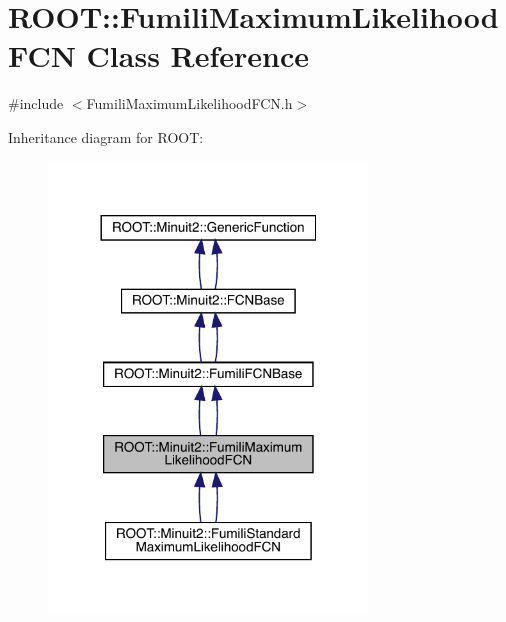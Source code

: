 \hypertarget{classROOT_1_1Minuit2_1_1FumiliMaximumLikelihoodFCN}{}\section{R\+O\+OT\+:\+:Fumili\+Maximum\+Likelihood\+F\+CN Class Reference}
\label{classROOT_1_1Minuit2_1_1FumiliMaximumLikelihoodFCN}


{\ttfamily \#include $<$Fumili\+Maximum\+Likelihood\+F\+C\+N.\+h$>$}



Inheritance diagram for R\+O\+OT\+:\nopagebreak
\begin{figure}[H]
\begin{center}
\leavevmode
\includegraphics[width=240pt]{d6/d0b/classROOT_1_1Minuit2_1_1FumiliMaximumLikelihoodFCN__inherit__graph}
\end{center}
\end{figure}


